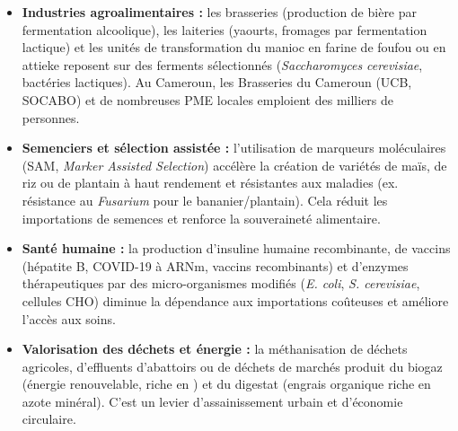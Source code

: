\documentclass[11pt]{article}
\newcommand{\cle}[1]{{\popxbold\color{popdark}#1}}
\begin{document}
\begin{itemize}
    \item \textbf{Industries agroalimentaires :} les brasseries (production de bière par fermentation alcoolique), les laiteries (yaourts, fromages par fermentation lactique) et les unités de transformation du manioc en \cle{farine de foufou} ou en \cle{attieke} reposent sur des ferments sélectionnés (\emph{Saccharomyces cerevisiae}, bactéries lactiques). Au Cameroun, les \cle{Brasseries du Cameroun} (UCB, SOCABO) et de nombreuses PME locales emploient des milliers de personnes.
    \item \textbf{Semenciers et sélection assistée :} l'utilisation de marqueurs moléculaires (\cle{SAM}, \emph{Marker Assisted Selection}) accélère la création de variétés de maïs, de riz ou de plantain à haut rendement et résistantes aux maladies (ex. résistance au \emph{Fusarium} pour le bananier/plantain). Cela réduit les importations de semences et renforce la souveraineté alimentaire.
    \item \textbf{Santé humaine :} la production d'\cle{insuline humaine recombinante}, de vaccins (hépatite B, COVID-19 à ARNm, vaccins recombinants) et d'enzymes thérapeutiques par des micro-organismes modifiés (\emph{E. coli}, \emph{S. cerevisiae}, cellules CHO) diminue la dépendance aux importations coûteuses et améliore l'accès aux soins.
    \item \textbf{Valorisation des déchets et énergie :} la méthanisation de déchets agricoles, d'effluents d'abattoirs ou de déchets de marchés produit du \cle{biogaz} (énergie renouvelable, riche en ) et du \cle{digestat} (engrais organique riche en azote minéral). C'est un levier d'assainissement urbain et d'économie circulaire.
\end{itemize}
\end{document}
